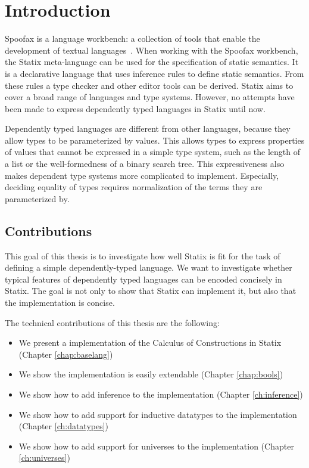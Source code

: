\chapter{Introduction}

Spoofax is a language workbench: a collection of tools that enable the development of textual languages~\cite{spoofax}. When working with the Spoofax workbench, the Statix meta-language can be used for the specification of static semantics. It is a declarative language that uses inference rules to define static semantics. From these rules a type checker and other editor tools can be derived. Statix aims to cover a broad range of languages and type systems. However, no attempts have been made to express dependently typed languages in Statix until now. 

Dependently typed languages are different from other languages, because they allow types to be parameterized by values. This allows types to express properties of values that cannot be expressed in a simple type system, such as the length of a list or the well-formedness of a binary search tree. This expressiveness also makes dependent type systems more complicated to implement. Especially, deciding equality of types requires normalization of the terms they are parameterized by. 

\section*{Contributions}
This goal of this thesis is to investigate how well Statix is fit for the task of defining a simple dependently-typed language. We want to investigate whether typical features of dependently typed languages can be encoded concisely in Statix. The goal is not only to show that Statix can implement it, but also that the implementation is concise.

The technical contributions of this thesis are the following:
\begin{itemize}
	\item We present a implementation of the Calculus of Constructions in Statix (Chapter \ref{chap:baselang})
	\item We show the implementation is easily extendable (Chapter \ref{chap:bools})
	\item We show how to add inference to the implementation (Chapter \ref{ch:inference})
	\item We show how to add support for inductive datatypes to the implementation (Chapter \ref{ch:datatypes})
	\item We show how to add support for universes to the implementation (Chapter \ref{ch:universes})
\end{itemize}

